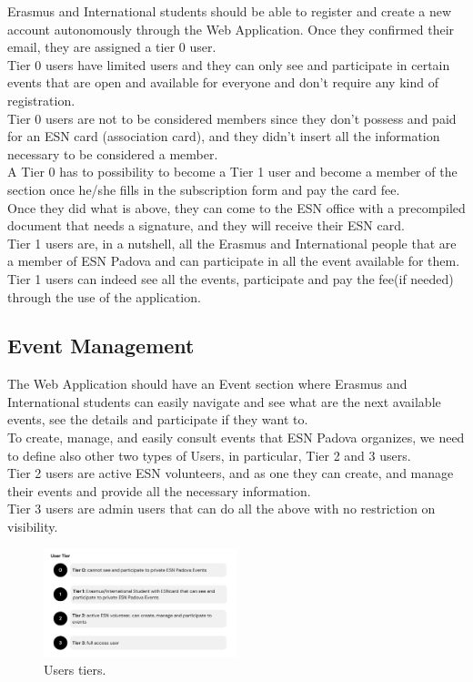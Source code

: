 Erasmus and International students should be able to register and create a new account autonomously through the Web Application.
Once they confirmed their email, they are assigned a tier 0 user.\\
Tier 0 users have limited users and they can only see and participate in certain events that are open and available for everyone
and don't require any kind of registration.\\
Tier 0 users are not to be considered members since they don't possess and paid for an ESN card (association card), and they didn't
insert all the information necessary to be considered a member.\\
A Tier 0 has to possibility to become a Tier 1 user and become a member of the section once he/she fills in the subscription form and 
pay the card fee.\\
Once they did what is above, they can come to the ESN office with a precompiled document that needs a signature, and they will receive
their ESN card.\\
Tier 1 users are, in a nutshell, all the Erasmus and International people that are a member of ESN Padova and can participate in all
the event available for them.\\
Tier 1 users can indeed see all the events, participate and pay the fee(if needed) through the use of the application.

\subsection{Event Management}

The Web Application should have an Event section where Erasmus and International students can easily navigate and see what are
the next available events, see the details and participate if they want to.\\
To create, manage, and easily consult events that ESN Padova organizes, we need to define also other two types of Users, 
in particular, Tier 2 and 3 users.\\
Tier 2 users are active ESN volunteers, and as one they can create, and manage their events and provide all the necessary
 information.\\
Tier 3 users are admin users that can do all the above with no restriction on visibility.

\begin{figure}[h!]
    \centering
    \includegraphics[width=0.5\textwidth]{images/tiers.jpg}
    \caption{Users tiers.}
    \label{fig:users_tiers}
\end{figure}